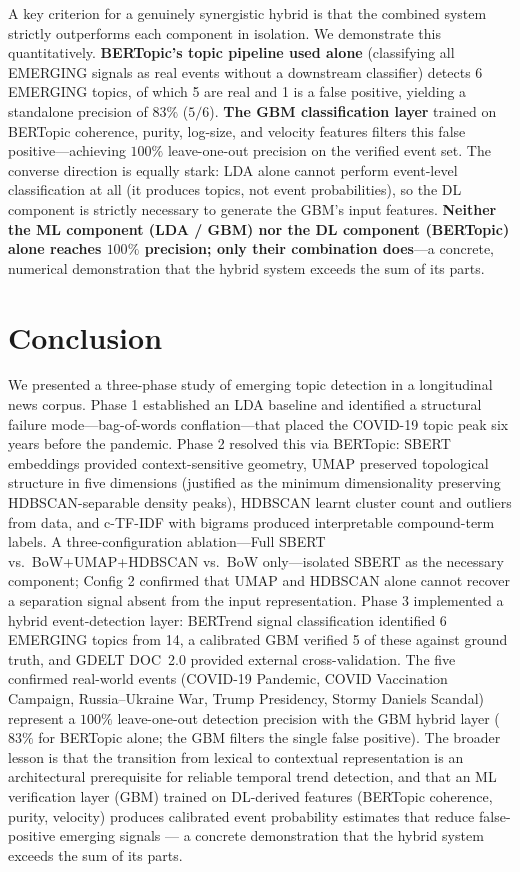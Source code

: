 \documentclass[10pt,twocolumn,a4paper]{article}
\begin{document}
A key criterion for a genuinely synergistic hybrid is that the combined system strictly outperforms each component in isolation. We demonstrate this quantitatively. \textbf{BERTopic's topic pipeline used alone} (classifying all EMERGING signals as real events without a downstream classifier) detects 6 EMERGING topics, of which 5 are real and 1 is a false positive, yielding a standalone precision of $83\%$ ($5/6$). \textbf{The GBM classification layer} trained on BERTopic coherence, purity, log-size, and velocity features filters this false positive—achieving $100\%$ leave-one-out precision on the verified event set. The converse direction is equally stark: LDA alone cannot perform event-level classification at all (it produces topics, not event probabilities), so the DL component is strictly necessary to generate the GBM's input features. \textbf{Neither the ML component (LDA / GBM) nor the DL component (BERTopic) alone reaches $100\%$ precision; only their combination does}—a concrete, numerical demonstration that the hybrid system exceeds the sum of its parts.

\section{Conclusion}
\label{sec:conclusion}

We presented a three-phase study of emerging topic detection in a longitudinal news corpus. Phase 1 established an LDA baseline and identified a structural failure mode---bag-of-words conflation---that placed the COVID-19 topic peak six years before the pandemic. Phase 2 resolved this via BERTopic: SBERT embeddings provided context-sensitive geometry, UMAP preserved topological structure in five dimensions (justified as the minimum dimensionality preserving HDBSCAN-separable density peaks), HDBSCAN learnt cluster count and outliers from data, and c-TF-IDF with bigrams produced interpretable compound-term labels. A three-configuration ablation---Full SBERT vs.\ BoW+UMAP+HDBSCAN vs.\ BoW only---isolated SBERT as the necessary component; Config 2 confirmed that UMAP and HDBSCAN alone cannot recover a separation signal absent from the input representation. Phase 3 implemented a hybrid event-detection layer: BERTrend signal classification identified 6 EMERGING topics from 14, a calibrated GBM verified 5 of these against ground truth, and GDELT DOC~2.0 provided external cross-validation. The five confirmed real-world events (COVID-19 Pandemic, COVID Vaccination Campaign, Russia--Ukraine War, Trump Presidency, Stormy Daniels Scandal) represent a $100\%$ leave-one-out detection precision with the GBM hybrid layer ($83\%$ for BERTopic alone; the GBM filters the single false positive). The broader lesson is that the transition from lexical to contextual representation is an architectural prerequisite for reliable temporal trend detection, and that an ML verification layer (GBM) trained on DL-derived features (BERTopic coherence, purity, velocity) produces calibrated event probability estimates that reduce false-positive emerging signals — a concrete demonstration that the hybrid system exceeds the sum of its parts.
\end{document}
